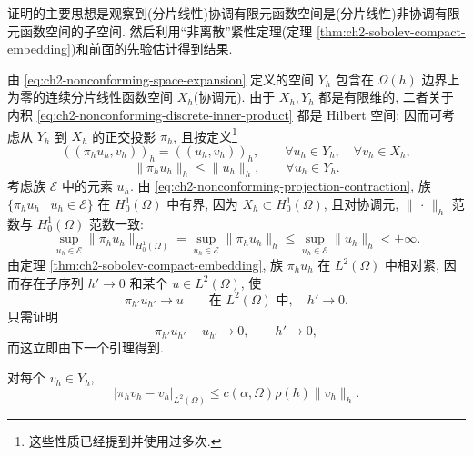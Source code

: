 \begin{Proof}
证明的主要思想是观察到(分片线性)协调有限元函数空间是(分片线性)非协调有限元函数空间的子空间. 然后利用``非离散''紧性定理(定理 \ref{thm:ch2-sobolev-compact-embedding})和前面的先验估计得到结果.

由 \eqref{eq:ch2-nonconforming-space-expansion} 定义的空间 $Y_h$ 包含在 $\Omega(h)$ 边界上为零的连续分片线性函数空间 $X_h$(协调元). 由于 $X_h,Y_h$ 都是有限维的, 二者关于内积 \eqref{eq:ch2-nonconforming-discrete-inner-product} 都是 Hilbert 空间; 因而可考虑从 $Y_h$ 到 $X_h$ 的正交投影 $\pi_h$, 且按定义\footnote{这些性质已经提到并使用过多次.}
\begin{equation}
((\pi_hu_h,v_h))_h=((u_h,v_h))_h,
\qquad\forall u_h\in Y_h,\quad\forall v_h\in X_h,
\label{eq:ch2-nonconforming-orthogonal-projection}
\end{equation}
\begin{equation}
\lVert\pi_hu_h\rVert_h\leq\lVert u_h\rVert_h,
\qquad\forall u_h\in Y_h.
\label{eq:ch2-nonconforming-projection-contraction}
\end{equation}
考虑族 $\mathcal E$ 中的元素 $u_h$. 由 \eqref{eq:ch2-nonconforming-projection-contraction}, 族 $\{\pi_hu_h\mid u_h\in\mathcal E\}$ 在 $H_0^1(\Omega)$ 中有界, 因为 $X_h\subset H_0^1(\Omega)$, 且对协调元, $\lVert\,\cdot\,\rVert_h$ 范数与 $H_0^1(\Omega)$ 范数一致:
\[
\sup_{u_h\in\mathcal E}\lVert\pi_hu_h\rVert_{H_0^1(\Omega)}
=\sup_{u_h\in\mathcal E}\lVert\pi_hu_h\rVert_h
\leq\sup_{u_h\in\mathcal E}\lVert u_h\rVert_h<+\infty.
\]
由定理 \ref{thm:ch2-sobolev-compact-embedding}, 族 $\pi_hu_h$ 在 $L^2(\Omega)$ 中相对紧, 因而存在子序列 $h'\to0$ 和某个 $u\in L^2(\Omega)$, 使
\[
\pi_{h'}u_{h'}\longrightarrow u
\qquad\text{在 }L^2(\Omega)\text{ 中},\quad h'\to0.
\]
只需证明
\begin{equation}
\pi_{h'}u_{h'}-u_{h'}\longrightarrow0,
\qquad h'\to0,
\label{eq:ch2-nonconforming-projection-error-convergence}
\end{equation}
而这立即由下一个引理得到.
\end{Proof}

\begin{Lemma}
\label{lem:ch2-nonconforming-projection-error}
对每个 $v_h\in Y_h$,
\begin{equation}
|\pi_hv_h-v_h|_{L^2(\Omega)}
\leq c(\alpha,\Omega)\rho(h)\lVert v_h\rVert_h.
\label{eq:ch2-nonconforming-projection-error}
\end{equation}
\end{Lemma}

